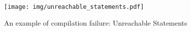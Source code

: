     \begin{figure}[t]
    \centering
    \texttt{[image: img/unreachable\_statements.pdf]}
    \caption{An example of compilation failure: Unreachable Statements}
    \label{fig:unreachable_statements}
    \end{figure}